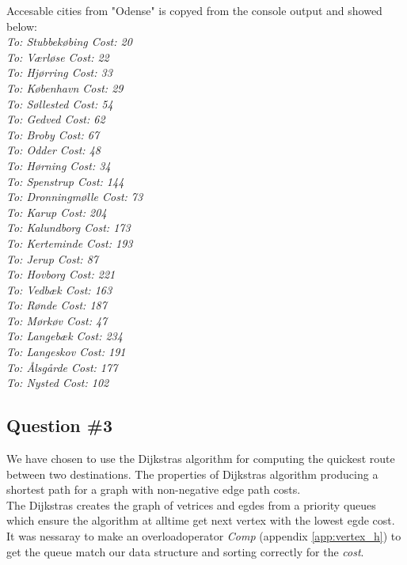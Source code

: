 Accesable cities from "Odense" is copyed from the console output and showed below:\\ \emph{
To: Stubbekøbing Cost: 20\\
To: Værløse Cost: 22\\
To: Hjørring Cost: 33\\
To: København Cost: 29\\
To: Søllested Cost: 54\\
To: Gedved Cost: 62\\
To: Broby Cost: 67\\
To: Odder Cost: 48\\
To: Hørning Cost: 34\\
To: Spenstrup Cost: 144\\
To: Dronningmølle Cost: 73\\
To: Karup Cost: 204\\
To: Kalundborg Cost: 173\\
To: Kerteminde Cost: 193\\
To: Jerup Cost: 87\\
To: Hovborg Cost: 221\\
To: Vedbæk Cost: 163\\
To: Rønde Cost: 187\\
To: Mørkøv Cost: 47\\
To: Langebæk Cost: 234\\
To: Langeskov Cost: 191\\
To: Ålsgårde Cost: 177\\
To: Nysted Cost: 102\\}



\subsection{Question \#3}
We have chosen to use the Dijkstras algorithm for computing the quickest route between two destinations. The properties of Dijkstras algorithm producing a shortest path for a graph with non-negative edge path costs. \\
The Dijkstras creates the graph of vetrices and egdes from a priority queues which ensure the algorithm at alltime  get next vertex with the lowest egde cost. It was nessaray to make an overloadoperator \emph{Comp} (appendix \ref{app:vertex_h}) to get the queue match our data structure and sorting correctly for the \emph{cost}.\\

